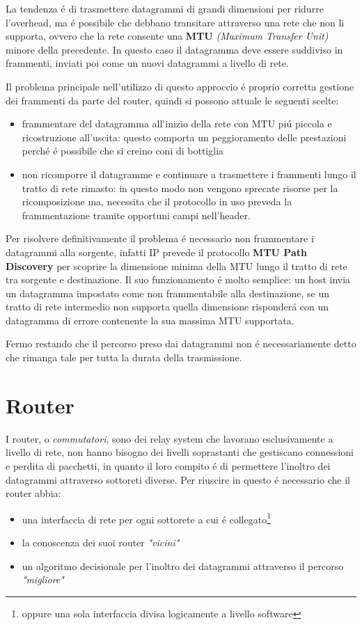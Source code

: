 \documentclass[12pt]{article}
\begin{document}
La tendenza \'e di trasmettere datagrammi di grandi dimensioni per ridurre l'overhead, ma \'e possibile che debbano
transitare attraverso una rete che non li supporta, ovvero che la rete consente una \textbf{MTU} \textit{(Maximum 
Transfer Unit)} minore della precedente. In questo caso il datagramma deve essere suddiviso in frammenti, inviati
poi come un nuovi datagrammi a livello di rete.

Il problema principale nell'utilizzo di questo approccio \'e proprio corretta gestione dei frammenti da parte del 
router, quindi si possono attuale le seguenti scelte:
\begin{itemize}[noitemsep]
    \item frammentare del datagramma all'inizio della rete con MTU pi\'u piccola e ricostruzione all'uscita: questo 
          comporta un peggioramento delle prestazioni perch\'e \'e possibile che si creino coni di bottiglia
    \item non ricomporre il datagramme e continuare a trasmettere i frammenti lungo il tratto di rete rimasto: in questo 
          modo non vengono sprecate risorse per la ricomposizione ma, necessita che il protocollo in uso preveda la 
          frammentazione tramite opportuni campi nell'header.    
\end{itemize}
Per risolvere definitivamente il problema \'e necessario non frammentare i datagrammi alla sorgente, infatti IP prevede 
il protocollo \textbf{MTU Path Discovery} per scoprire la dimensione minima della MTU lungo il tratto di rete tra 
sorgente e destinazione. Il suo funzionamento \'e molto semplice: un host invia un datagramma impostato come non 
frammentabile alla destinazione, se un tratto di rete intermedio non supporta quella dimensione risponder\'a con
un datagramma di errore contenente la sua massima MTU supportata.

Fermo restando che il percorso preso dai datagrammi non \'e necessariamente detto che rimanga tale per tutta 
la durata della trasmissione.



\clearpage
\section{Router}
I router, o \textit{commutatori}, sono dei relay system che lavorano esclusivamente a livello di rete, non hanno bisogno 
dei livelli soprastanti che gestiscano connessioni e perdita di pacchetti, in quanto il loro compito \'e di permettere 
l'inoltro dei datagrammi attraverso sottoreti diverse. Per riuscire in questo \'e necessario che il router abbia:
\begin{itemize}[noitemsep]
	\item una interfaccia di rete per ogni sottorete a cui \'e collegato\footnote{oppure una sola interfaccia divisa 
	      logicamente a livello software}
	\item la conoscenza dei suoi router \textit{"vicini"}
	\item un algoritmo decisionale per l'inoltro dei datagrammi attraverso il percorso \textit{"migliore"}
\end{itemize}
\end{document}
